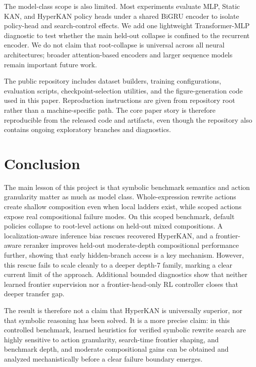 \documentclass[11pt]{article}
\newcommand{\hyperkan}{HyperKAN}
\newcommand{\staticKAN}{Static KAN}
\newcommand{\mlp}{MLP}
\begin{document}
The model-class scope is also limited. Most experiments evaluate \mlp{}, \staticKAN{}, and \hyperkan{} policy heads under a shared BiGRU encoder to isolate policy-head and search-control effects. We add one lightweight Transformer-\mlp{} diagnostic to test whether the main held-out collapse is confined to the recurrent encoder. We do not claim that root-collapse is universal across all neural architectures; broader attention-based encoders and larger sequence models remain important future work.

The public repository includes dataset builders, training configurations, evaluation scripts, checkpoint-selection utilities, and the figure-generation code used in this paper. Reproduction instructions are given from repository root rather than a machine-specific path. The core paper story is therefore reproducible from the released code and artifacts, even though the repository also contains ongoing exploratory branches and diagnostics.

\section{Conclusion}

The main lesson of this project is that symbolic benchmark semantics and action granularity matter as much as model class. Whole-expression rewrite actions create shallow composition even when local ladders exist, while scoped actions expose real compositional failure modes. On this scoped benchmark, default policies collapse to root-level actions on held-out mixed compositions. A localization-aware inference bias rescues recovered \hyperkan{}, and a frontier-aware reranker improves held-out moderate-depth compositional performance further, showing that early hidden-branch access is a key mechanism. However, this rescue fails to scale cleanly to a deeper depth-7 family, marking a clear current limit of the approach. Additional bounded diagnostics show that neither learned frontier supervision nor a frontier-head-only RL controller closes that deeper transfer gap.

The result is therefore not a claim that \hyperkan{} is universally superior, nor that symbolic reasoning has been solved. It is a more precise claim: in this controlled benchmark, learned heuristics for verified symbolic rewrite search are highly sensitive to action granularity, search-time frontier shaping, and benchmark depth, and moderate compositional gains can be obtained and analyzed mechanistically before a clear failure boundary emerges.
\end{document}
